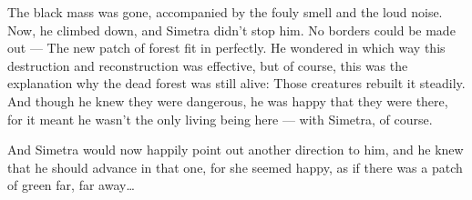 The black mass was gone, accompanied by the fouly smell and the loud noise. Now, he climbed down, and Simetra didn't stop him. No borders could be made out --- The new patch of forest fit in perfectly. He wondered in which way this destruction and reconstruction was effective, but of course, this was the explanation why the dead forest was still alive: Those creatures rebuilt it steadily. 
And though he knew they were dangerous, he was happy that they were there, for it meant he wasn't the only living being here --- with Simetra, of course.

And Simetra would now happily point out another direction to him, and he knew that he should advance in that one, for she seemed happy, as if there was a patch of green far, far away\dots

